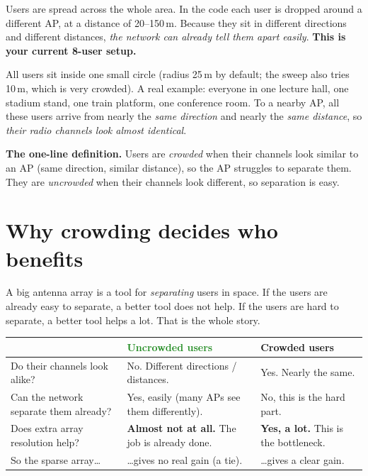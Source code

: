 \documentclass[11pt]{article}
\begin{document}
\begin{description}[leftmargin=0pt,itemsep=4pt]
\item[\textcolor{ForestGreen}{\textbf{Uncrowded (``baseline'' in the code).}}] Users are spread
  across the whole area. In the code each user is dropped around a different AP, at a distance
  of 20--150\,m. Because they sit in different directions and different distances, \emph{the
  network can already tell them apart easily}. \textbf{This is your current 8-user setup.}
\item[\textcolor{BrickRed}{\textbf{Crowded (``hotspot'' in the code).}}] All users sit inside one
  small circle (radius 25\,m by default; the sweep also tries 10\,m, which is very crowded). A
  real example: everyone in one lecture hall, one stadium stand, one train platform, one
  conference room. To a nearby AP, all these users arrive from nearly the \emph{same direction}
  and nearly the \emph{same distance}, so \emph{their radio channels look almost identical}.
\end{description}

\begin{keybox}
\textbf{The one-line definition.} Users are \emph{crowded} when their channels look similar to
an AP (same direction, similar distance), so the AP struggles to separate them. They are
\emph{uncrowded} when their channels look different, so separation is easy.
\end{keybox}

\section{Why crowding decides who benefits}

A big antenna array is a tool for \emph{separating} users in space. If the users are already
easy to separate, a better tool does not help. If the users are hard to separate, a better tool
helps a lot. That is the whole story.

\begin{center}
\renewcommand{\arraystretch}{1.25}
\begin{tabular}{@{}p{3.1cm}p{5.6cm}p{5.6cm}@{}}
\toprule
 & \textcolor{ForestGreen}{\textbf{Uncrowded users}} & \textcolor{BrickRed}{\textbf{Crowded users}}\\
\midrule
Do their channels look alike? & No. Different directions / distances. & Yes. Nearly the same.\\
Can the network separate them already? & Yes, easily (many APs see them differently). & No, this is the hard part.\\
Does extra array resolution help? & \textbf{Almost not at all.} The job is already done. & \textbf{Yes, a lot.} This is the bottleneck.\\
So the sparse array\dots & \dots gives no real gain (a tie). & \dots gives a clear gain.\\
\bottomrule
\end{tabular}
\end{center}
\end{document}
